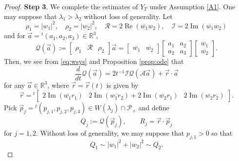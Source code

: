 \documentclass[11pt,a4paper,twosides]{amsart}
\theoremstyle{plain}
\theoremstyle{remark}
\numberwithin{equation}{section}
\newcommand{\R}{\mathbb{R}}
\renewcommand{\Im}{\operatorname{Im}}
\renewcommand{\Re}{\operatorname{Re}}
\theoremstyle{definition}
\newcommand{\1}{{\bf 1}_{\{|x| < |t|\}}}
\newcommand{\ol}{\overline}
\begin{document}
\begin{proof}
  {\bf Step 3}. We complete the estimates of $Y_T$
under Assumption \ref{A1}.
One may suppose that $\lambda_1>\lambda_2$ without loss of generality.
Let 
  \begin{equation*}
    \rho_1 = |w_1|^2,\quad \rho_2 = |w_2|^2, \quad \mathcal{R} = 2\Re(\ol{w_1}w_2),\quad  \mathcal{I} = 2\Im(\ol{w_1}w_2) 
  \end{equation*}
  and for $\vec{a}={}^t\!(a_1,a_2,a_3) \in \R^3$,
  \begin{equation}
  \mathcal{Q}(\vec a) := \begin{bmatrix}
      \rho_1 & \mathcal{R} & \rho_2
    \end{bmatrix} \vec{a}= \begin{bmatrix}
    \overline{w_1} &
    \overline{w_2}
    \end{bmatrix}
    \begin{bmatrix}
      a_1 & a_2 \\ a_2 & a_3
    \end{bmatrix}
   \begin{bmatrix}
   w_1 \\ w_2
	\end{bmatrix}.\label{QA}
  \end{equation}
Then, we see from \eqref{eq:wsys} and Proposition \ref{prop:ode} that
  \begin{equation}\label{eq:rhosysgen}
    \frac{d}{dt}
   \mathcal{Q}(\vec a)  = 2t^{-1}\mathcal{I} 
    \mathcal{Q}(\mathscr{A}\vec a)
  + \vec{r}\cdot \vec{a}
    \end{equation}
    for any $\vec{a} \in \R^3$, where $\vec{r}=\vec{r}(t)$ is given by
    \begin{equation}\label{eq:rvec}
        \!\vec{r} =
    {}^t\begin{bmatrix}
      2\Im(\ol{w_1}r_1)                     &
      2\Im(\ol{w_1r_2}) + 2\Im(\ol{w_2}r_1) &
      2\Im(\ol{w_2}r_2)
    \end{bmatrix}.
  \end{equation}
Pick 
$
	\vec{p}_j = {}^t\!(
	p_{j,1} ,
	p_{j,2} ,
	p_{j,3} 
	)
	\in W(\lambda_j) \cap \mathcal{P}_+$ and define
\[
	Q_j := \mathcal{Q}(\vec{p}_j),\qquad
	R_j = \vec{r} \cdot \vec{p}_j
\]
for $j=1,2$.
Without loss of generality, we may suppose that $p_{j,1}>0$ so that
   \begin{equation}\label{eq:rhopmequiv}
   Q_1 \sim |w_1|^2 + |w_2|^2 \sim Q_2.
   \end{equation}

\end{proof}
\end{document}
